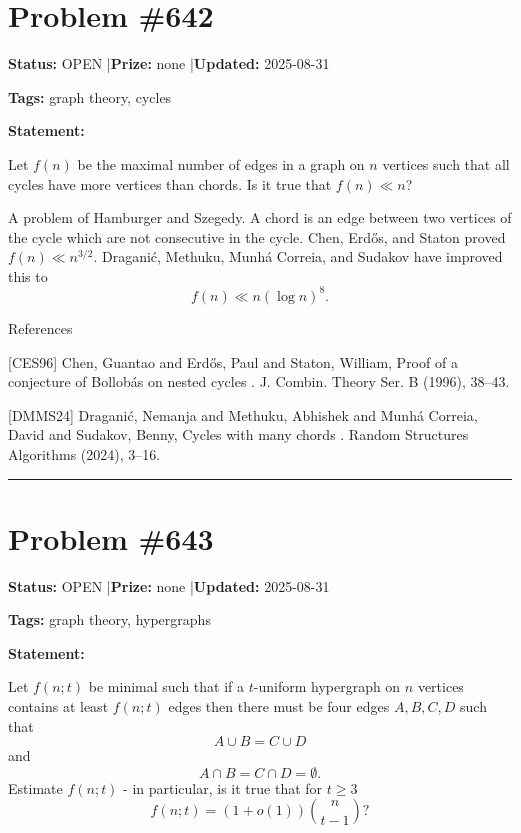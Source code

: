 \documentclass{article}
\begin{document}
\section{Problem \#642}
\label{prob:642}

\noindent\textbf{Status:} OPEN \quad|\quad \textbf{Prize:} none \quad|\quad \textbf{Updated:} 2025-08-31

\noindent\textbf{Tags:} graph theory, cycles

\medskip

\noindent\textbf{Statement:}

Let $f(n)$ be the maximal number of edges in a graph on $n$ vertices such that all cycles have more vertices than chords. Is it true that $f(n)\ll n$?




A problem of Hamburger and Szegedy. A chord is an edge between two vertices of the cycle which are not consecutive in the cycle. Chen, Erd\H{o}s, and Staton \cite{CES96} proved $f(n) \ll n^{3/2}$. Dragani\'{c}, Methuku, Munh\'{a} Correia, and Sudakov \cite{DMMS24} have improved this to\[f(n) \ll n(\log n)^8.\]




References

[CES96] Chen, Guantao and Erd\H{o}s, Paul and Staton, William, Proof of a conjecture of {B}ollob\'{a}s on nested cycles . J. Combin. Theory Ser. B (1996), 38--43.

[DMMS24] Dragani\'c, Nemanja and Methuku, Abhishek and Munh\'{a}{} Correia, David and Sudakov, Benny, Cycles with many chords . Random Structures Algorithms (2024), 3--16.

\noindent\rule{\linewidth}{0.4pt}


\section{Problem \#643}
\label{prob:643}

\noindent\textbf{Status:} OPEN \quad|\quad \textbf{Prize:} none \quad|\quad \textbf{Updated:} 2025-08-31

\noindent\textbf{Tags:} graph theory, hypergraphs

\medskip

\noindent\textbf{Statement:}

Let $f(n;t)$ be minimal such that if a $t$-uniform hypergraph on $n$ vertices contains at least $f(n;t)$ edges then there must be four edges $A,B,C,D$ such that\[A\cup B= C\cup D\]and\[A\cap B=C\cap D=\emptyset.\]Estimate $f(n;t)$ - in particular, is it true that for $t\geq 3$\[f(n;t)=(1+o(1))\binom{n}{t-1}?\]
\end{document}
